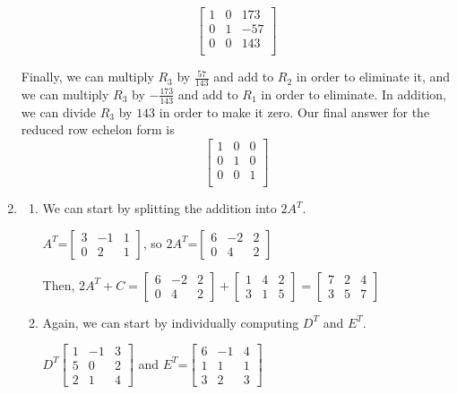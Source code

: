 \documentclass[11pt, letterpaper, twoside]{article}
\begin{document}
\begin{enumerate}
$$\begin{bmatrix}
1 & 0 & 173\\
0 & 1 & -57\\
0 & 0 & 143\\
\end{bmatrix}$$

Finally, we can multiply $R_3$ by $\frac {57}{143}$ and add to $R_2$ in order to eliminate it, and we can multiply $R_3$ by $-\frac{173}{143}$ and add to $R_1$ in order to eliminate. In addition, we can divide $R_3$ by $143$ in order to make it zero. Our final answer for the reduced row echelon form is
$$\begin{bmatrix}
1 & 0 & 0\\
0 & 1 & 0\\
0 & 0 & 1\\
\end{bmatrix}$$
\item
\begin{enumerate}[label=(\alph*)]
\item We can start by splitting the addition into $2A^T$.

$A^T$=$\begin{bmatrix}
3 & -1 & 1\\
0 & 2 & 1
\end{bmatrix}$, so $2A^T$=$\begin{bmatrix}
6 & -2 & 2\\
0 & 4 & 2
\end{bmatrix}$

Then, $2A^T+C=\begin{bmatrix}
6 & -2 & 2\\
0 & 4 & 2
\end{bmatrix}+\begin{bmatrix}
1 & 4 & 2\\
3 & 1 & 5
\end{bmatrix}=\begin{bmatrix}
7 & 2 & 4\\
3 & 5 & 7
\end{bmatrix}$
\item Again, we can start by individually computing $D^T$ and $E^T$.

$D^T\begin{bmatrix}
1 & -1 & 3\\
5 & 0 & 2\\
2 & 1 & 4
\end{bmatrix}$ and $E^T$=$\begin{bmatrix}
6 & -1 & 4\\
1 & 1 & 1\\
3 & 2 & 3
\end{bmatrix}$


\end{enumerate}
\end{enumerate}
\end{document}
